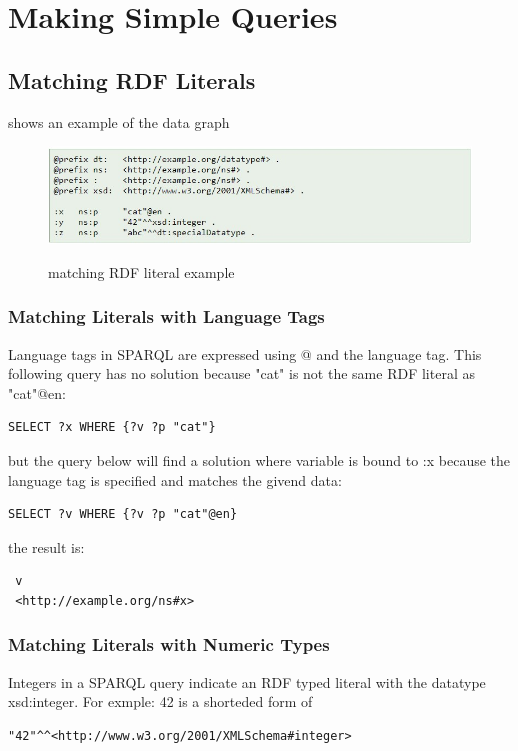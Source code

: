 

\section{Making Simple Queries}
\subsection{Matching RDF Literals}
\label{fig:rdf literal example} shows an example of the data graph 
\begin{figure}[htp]\centering
\caption{matching RDF literal example}
\includegraphics[scale=0.8]{langsci/img/rdfLiteralExample.jpg}
\label{fig:rdf literal example}
\end{figure} 
\subsubsection{Matching Literals with Language Tags}
Language tags in SPARQL are expressed using @ and the language tag.
This following query has no solution because "cat" is not the same RDF literal as "cat"@en:
\begin{verbatim}
SELECT ?x WHERE {?v ?p "cat"}
\end{verbatim}
but the query below will find a solution where variable is bound to :x because the language tag is specified and matches the givend data:
\begin{verbatim}
SELECT ?v WHERE {?v ?p "cat"@en}
\end{verbatim}
the result is:
\begin{verbatim}
 v
 <http://example.org/ns#x>
\end{verbatim}

\subsubsection{Matching Literals with Numeric Types}
Integers in a SPARQL query indicate an RDF typed literal with the datatype xsd:integer. For exmple: 42 is a shorteded form of 
\begin{verbatim}
"42"^^<http://www.w3.org/2001/XMLSchema#integer>
\end{verbatim}
